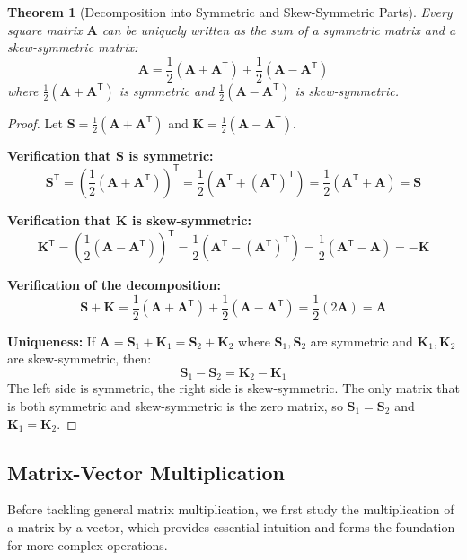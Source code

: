 \documentclass[12pt]{article}
\numberwithin{equation}{section}
\newcommand{\mat}[1]{\mathbf{#1}}        %
\newcommand{\trans}{\mathsf{T}}          %
\theoremstyle{plain}
\newtheorem{theorem}{Theorem}[section]
\theoremstyle{definition}
\theoremstyle{remark}
\begin{document}
\begin{theorem}[Decomposition into Symmetric and Skew-Symmetric Parts]
Every square matrix $\mat{A}$ can be uniquely written as the sum of a symmetric matrix and a skew-symmetric matrix:
$$\mat{A} = \frac{1}{2}(\mat{A} + \mat{A}^{\trans}) + \frac{1}{2}(\mat{A} - \mat{A}^{\trans})$$
where $\frac{1}{2}(\mat{A} + \mat{A}^{\trans})$ is symmetric and $\frac{1}{2}(\mat{A} - \mat{A}^{\trans})$ is skew-symmetric.
\end{theorem}

\begin{proof}
Let $\mat{S} = \frac{1}{2}(\mat{A} + \mat{A}^{\trans})$ and $\mat{K} = \frac{1}{2}(\mat{A} - \mat{A}^{\trans})$.

\textbf{Verification that $\mat{S}$ is symmetric:}
$$\mat{S}^{\trans} = \left(\frac{1}{2}(\mat{A} + \mat{A}^{\trans})\right)^{\trans} = \frac{1}{2}(\mat{A}^{\trans} + (\mat{A}^{\trans})^{\trans}) = \frac{1}{2}(\mat{A}^{\trans} + \mat{A}) = \mat{S}$$

\textbf{Verification that $\mat{K}$ is skew-symmetric:}
$$\mat{K}^{\trans} = \left(\frac{1}{2}(\mat{A} - \mat{A}^{\trans})\right)^{\trans} = \frac{1}{2}(\mat{A}^{\trans} - (\mat{A}^{\trans})^{\trans}) = \frac{1}{2}(\mat{A}^{\trans} - \mat{A}) = -\mat{K}$$

\textbf{Verification of the decomposition:}
$$\mat{S} + \mat{K} = \frac{1}{2}(\mat{A} + \mat{A}^{\trans}) + \frac{1}{2}(\mat{A} - \mat{A}^{\trans}) = \frac{1}{2}(2\mat{A}) = \mat{A}$$

\textbf{Uniqueness:} If $\mat{A} = \mat{S}_1 + \mat{K}_1 = \mat{S}_2 + \mat{K}_2$ where $\mat{S}_1, \mat{S}_2$ are symmetric and $\mat{K}_1, \mat{K}_2$ are skew-symmetric, then:
$$\mat{S}_1 - \mat{S}_2 = \mat{K}_2 - \mat{K}_1$$
The left side is symmetric, the right side is skew-symmetric. The only matrix that is both symmetric and skew-symmetric is the zero matrix, so $\mat{S}_1 = \mat{S}_2$ and $\mat{K}_1 = \mat{K}_2$.
\end{proof}

\subsection{Matrix-Vector Multiplication}

Before tackling general matrix multiplication, we first study the multiplication of a matrix by a vector, which provides essential intuition and forms the foundation for more complex operations.
\end{document}
